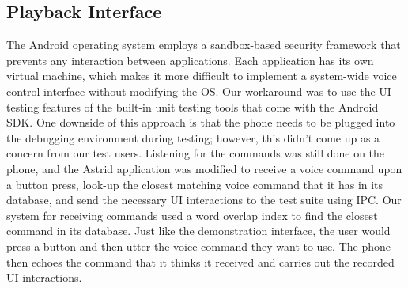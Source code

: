 \documentclass[letterpaper]{article}
\begin{document}
\subsection{Playback Interface}
The Android operating system employs a sandbox-based security framework that prevents any interaction between applications. 
Each application has its own virtual machine, which makes it more difficult to implement a system-wide voice control interface without modifying the OS.
Our workaround was to use the UI testing features of the built-in unit testing tools that come with the Android SDK.
One downside of this approach is that the phone needs to be plugged into the debugging environment during testing; however, 
this didn't come up as a concern from our test users. Listening for the commands was still done on the phone, 
and the Astrid application was modified to receive a voice command upon a button press, look-up the closest matching voice command 
that it has in its database, and send the necessary UI interactions to the test suite using IPC. Our system for receiving commands used 
a word overlap index to find the closest command in its database. Just like the demonstration interface, the user would press a button 
and then utter the voice command they want to use. The phone then echoes the command that it thinks it received and carries out the 
recorded UI interactions. 
 
\end{document}
